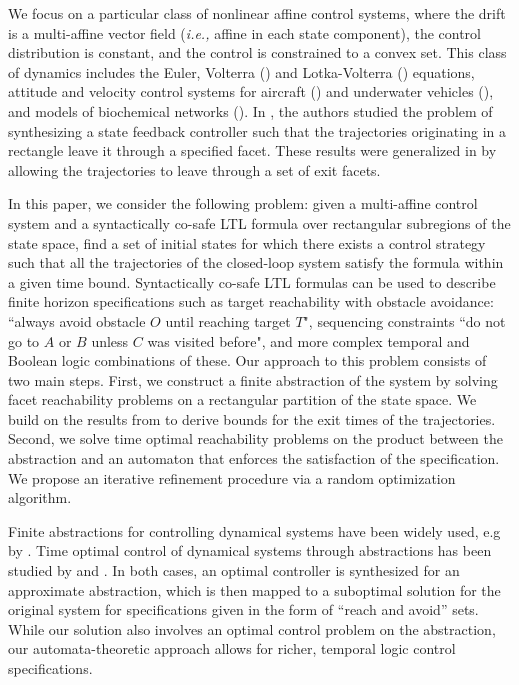 \documentclass{ifacconf}
\begin{document}
We focus on a particular class of nonlinear affine
control systems, where the drift
is a multi-affine vector field ({\em i.e.,} affine in each state
component), the control distribution is constant, and the
control is constrained to a convex set. This class of
dynamics includes the
Euler, Volterra (\cite{Volterra1926}) and Lotka-Volterra
(\cite{Lotka1925}) equations, attitude and velocity control systems
for aircraft (\cite{vanderSchaft}) and underwater vehicles
(\cite{Belta-ICRA2004}), and models
of biochemical networks (\cite{jong2002}). 
In \cite{Belta-TAC06}, the authors studied the problem of synthesizing a state feedback controller such that the trajectories originating in a rectangle leave it through a specified facet. These results were generalized in \cite{Habets2006} by allowing the trajectories to leave through a set of exit facets. 

In this paper, we consider the following problem: given a multi-affine control system and a syntactically co-safe LTL formula over rectangular subregions of the state space, find a set of initial states for which there exists a control strategy such that all the trajectories of the closed-loop system satisfy the formula within a given time bound. Syntactically co-safe LTL formulas can be used to describe finite horizon specifications such as target reachability with obstacle avoidance: ``always avoid obstacle $O$ until reaching target $T$", sequencing constraints ``do not go to $A$ or $B$ unless $C$ was visited before", and more complex temporal and Boolean logic combinations of these. Our approach to this problem consists of two main steps. First, we construct a finite abstraction of the system by solving facet reachability problems on a rectangular partition of the state space. We build on the results from \cite{Belta-TAC06,Habets2006} to derive bounds for the exit times of the trajectories. 
Second, we solve time optimal reachability problems on the product between the abstraction and an automaton that enforces the satisfaction of the specification. 
We propose an iterative refinement procedure via a random optimization algorithm.

Finite abstractions for controlling dynamical systems have been widely used, e.g by \cite{TP03}. 
Time optimal control of dynamical systems through abstractions has been studied by \cite{Mazo:2011} and \cite{Girard:2010Opt}. In both cases, an optimal controller is synthesized for an approximate abstraction, which is then mapped to a suboptimal solution for the original system for specifications given in the form of ``reach and avoid'' sets. While our solution also involves an optimal control problem on the abstraction, our automata-theoretic approach allows for richer, temporal logic 
control specifications.
\end{document}
